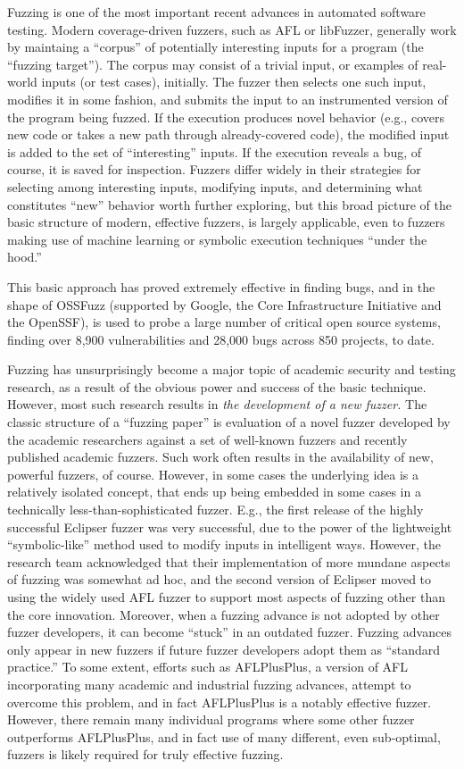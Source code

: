 \documentclass[numbers]{proposalnsf}
\begin{document}
Fuzzing \cite{fuzzoverview} is one of the most important recent advances in automated software testing.  Modern coverage-driven fuzzers, such as AFL or libFuzzer, generally work by maintaing a ``corpus'' of potentially interesting inputs for a program (the ``fuzzing target'').  The corpus may consist of a trivial input, or examples of real-world inputs (or test cases), initially.  The fuzzer then selects one such input, modifies it in some fashion, and submits the input to an instrumented version of the program being fuzzed.  If the execution produces novel behavior (e.g., covers new code or takes a new path through already-covered code), the modified input is added to the set of ``interesting'' inputs.   If the execution reveals a bug, of course, it is saved for inspection.   Fuzzers differ widely in their strategies for selecting among interesting inputs, modifying inputs, and determining what constitutes ``new'' behavior worth further exploring, but this broad picture of the basic structure of modern, effective fuzzers, is largely applicable, even to fuzzers making use of machine learning or symbolic execution techniques ``under the hood.''

This basic approach has proved extremely effective in finding bugs, and in the shape of OSSFuzz (supported by Google, the Core Infrastructure Initiative and the OpenSSF), is used to probe a large number of critical open source systems, finding over 8,900 vulnerabilities and 28,000 bugs across 850 projects, to date.

Fuzzing has unsurprisingly become a major topic of academic security and testing research, as a result of the obvious power and success of the basic technique.  However, most such research results in \emph{the development of a new fuzzer.}  The classic structure of a ``fuzzing paper'' is evaluation of a novel fuzzer developed by the academic researchers against a set of well-known fuzzers and recently published academic fuzzers.  Such work often results in the availability of new, powerful fuzzers, of course.  However, in some cases the underlying idea is a relatively isolated concept, that ends up being embedded in some cases in a technically less-than-sophisticated fuzzer.  E.g., the first release of the highly successful Eclipser fuzzer was very successful, due to the power of the lightweight ``symbolic-like'' method used to modify inputs in intelligent ways.  However, the research team acknowledged that their implementation of more mundane aspects of fuzzing was somewhat ad hoc, and the second version of Eclipser moved to using the widely used AFL fuzzer to support most aspects of fuzzing other than the core innovation.  Moreover, when a fuzzing advance is not adopted by other fuzzer developers, it can become ``stuck'' in an outdated fuzzer.  Fuzzing advances only appear in new fuzzers if future fuzzer developers adopt them as ``standard practice.''  To some extent, efforts such as AFLPlusPlus, a version of AFL incorporating many academic and industrial fuzzing advances, attempt to overcome this problem, and in fact AFLPlusPlus is a notably effective fuzzer.  However, there remain many individual programs where some other fuzzer outperforms AFLPlusPlus, and in fact use of many different, even sub-optimal, fuzzers is likely required for truly effective fuzzing.
\end{document}
